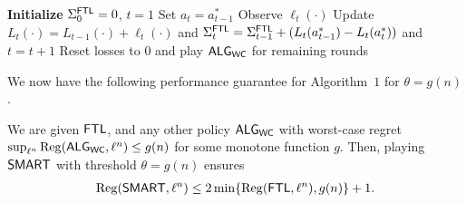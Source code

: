 \begin{algorithm}[ht] 
\SetAlgoNoLine
\caption{Switching via Monotone Adapted Regret Traces ($\bob$)}
\label{alg:bob}
\textbf{Initialize} $\Sigma^{\mathsf{FTL}}_0=0$, $t=1$ \;
{
    Set $a_t = a_{t-1}^{*}$%
    Observe $\ell_t(\cdot)$\; 
    Update $L_t(\cdot)=L_{t-1}(\cdot)+\ell_t(\cdot)$ and $\Sigma^{\mathsf{FTL}}_t=\Sigma^{\mathsf{FTL}}_{t-1}+(L_t(a_{t-1}^{*})-L_t(a_{t}^{*}))$ and $t = t+1$\;
}
Reset losses to $0$ and play $\mathsf{ALG}_{\mathsf{WC}}$ for remaining rounds\;
\end{algorithm}







We now have the following performance guarantee for Algorithm~$1$ for $\theta=g(n)$.
\begin{theorem} 
\label{thm:2ApproxRegret}
      We are given $\mathsf{FTL}$, and any other policy $\mathsf{ALG}_{\mathsf{WC}}$ with worst-case regret $\sup_{\ell^n} \mathrm{Reg}(\mathsf{ALG}_{\mathsf{WC}}, \ell^n) \le g(n)$
      for some monotone function $g$. Then, playing $\bob$ with threshold $\theta = g(n)$ ensures 
    \begin{align} \label{eq:2ApproxReg}
        \mathrm{Reg}(\mathsf{SMART}, \ell^n) \le 2 \min\{\mathrm{Reg}(\mathsf{FTL},\ell^n),g(n)\} + 1.
    \end{align}
\end{theorem}

